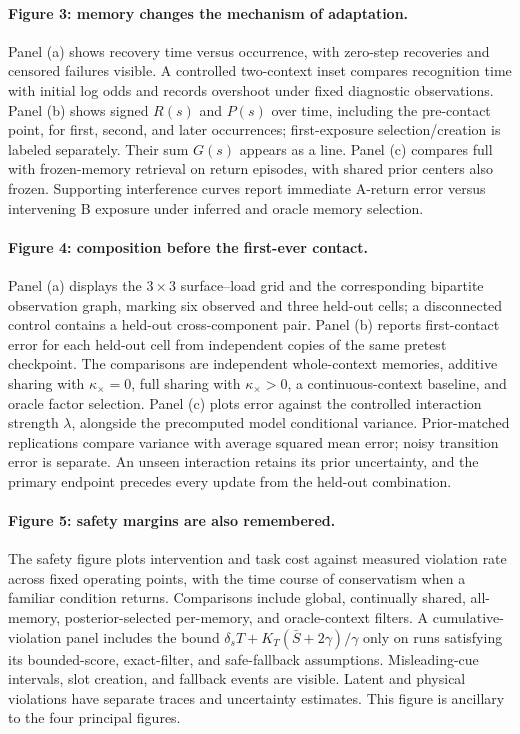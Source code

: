 \paragraph{Figure 3: memory changes the mechanism of adaptation.}
Panel (a) shows recovery time versus occurrence, with zero-step recoveries and censored failures visible. A controlled two-context inset compares recognition time with initial log odds and records overshoot under fixed diagnostic observations. Panel (b) shows signed $R(s)$ and $P(s)$ over time, including the pre-contact point, for first, second, and later occurrences; first-exposure selection/creation is labeled separately. Their sum $G(s)$ appears as a line. Panel (c) compares full \method{} with frozen-memory retrieval on return episodes, with shared prior centers also frozen. Supporting interference curves report immediate A-return error versus intervening B exposure under inferred and oracle memory selection.

\paragraph{Figure 4: composition before the first-ever contact.}
Panel (a) displays the $3\times3$ surface--load grid and the corresponding bipartite observation graph, marking six observed and three held-out cells; a disconnected control contains a held-out cross-component pair. Panel (b) reports first-contact error for each held-out cell from independent copies of the same pretest checkpoint. The comparisons are independent whole-context memories, additive sharing with $\kappa_\times=0$, full sharing with $\kappa_\times>0$, a continuous-context baseline, and oracle factor selection. Panel (c) plots error against the controlled interaction strength $\lambda$, alongside the precomputed model conditional variance. Prior-matched replications compare variance with average squared mean error; noisy transition error is separate. An unseen interaction retains its prior uncertainty, and the primary endpoint precedes every update from the held-out combination.

\paragraph{Figure 5: safety margins are also remembered.}
The safety figure plots intervention and task cost against measured violation rate across fixed operating points, with the time course of conservatism when a familiar condition returns. Comparisons include global, continually shared, all-memory, posterior-selected per-memory, and oracle-context filters. A cumulative-violation panel includes the bound $\delta_s T+K_T(\bar S+2\gamma)/\gamma$ only on runs satisfying its bounded-score, exact-filter, and safe-fallback assumptions. Misleading-cue intervals, slot creation, and fallback events are visible. Latent and physical violations have separate traces and uncertainty estimates. This figure is ancillary to the four principal figures.

